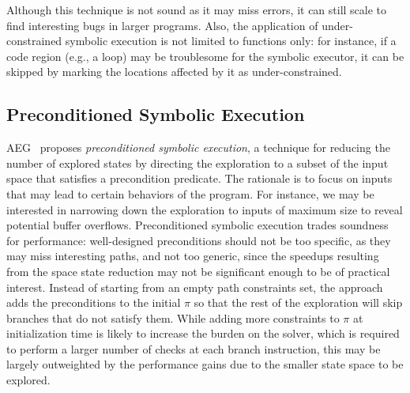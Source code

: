 
Although this technique is not sound as it may miss errors, it can still scale to find interesting bugs in larger programs. Also, the application of under-constrained symbolic execution is not limited to functions only: for instance, if a code region (e.g., a loop) may be troublesome for the symbolic executor, it can be skipped by marking the locations affected by it as under-constrained.

\subsection{Preconditioned Symbolic Execution}%
\label{precontioned-symbolic-execution}

{\sc AEG}~\cite{AEG-NDSS11} proposes {\em preconditioned symbolic execution}, a technique for reducing the number of explored states by directing the exploration to a subset of the input space that satisfies a precondition predicate. The rationale is to focus on inputs that may lead to certain behaviors of the program.
For instance, we may be interested in narrowing down the exploration to inputs of maximum size to reveal potential buffer overflows. Preconditioned symbolic execution trades soundness for performance: well-designed preconditions should not be too specific, as they may miss interesting paths, and not too generic, since the speedups resulting from the space state reduction may not be significant enough to be of practical interest. Instead of starting from an empty path constraints set, the approach adds the preconditions to the initial $\pi$ so that the rest of the exploration will skip branches that do not satisfy them. While adding more constraints to $\pi$ at initialization time is likely to increase the burden on the solver, which is required to perform a larger number of checks at each branch instruction, this may be largely outweighted by the performance gains due to the smaller state space to be explored.

